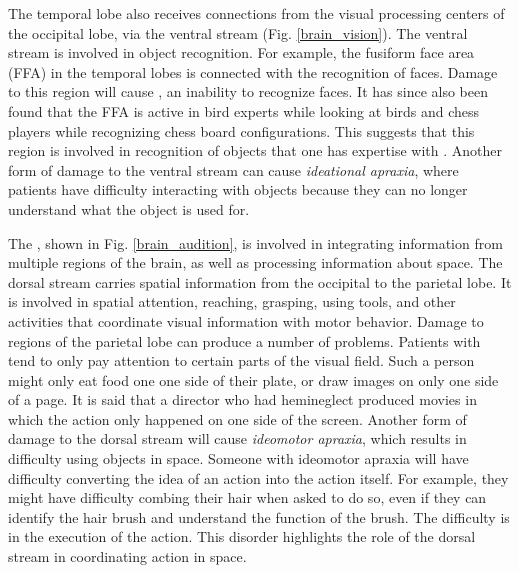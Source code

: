 The  temporal lobe also receives connections from the visual processing centers of the occipital lobe, via the ventral stream (Fig. \ref{brain_vision}). The ventral stream is involved in object recognition. For example, the fusiform face area (FFA) in the temporal lobes is connected with the recognition of faces. Damage to this region will cause , an inability to recognize faces. It has since also been found that the FFA is active in bird experts while looking at birds and chess players while recognizing chess board configurations. This suggests that this region is involved in recognition of objects that one has expertise with \cite{boggan2011chess}. Another form of damage to the ventral stream can cause \emph{ideational apraxia}, where patients have difficulty interacting with objects because they can no longer understand what the object is used for. 

The , shown in Fig. \ref{brain_audition}, is involved in integrating information from multiple regions of the brain, as well as processing information about space. The dorsal stream carries spatial information from the occipital to the parietal lobe. It is involved in spatial attention, reaching, grasping, using tools, and other activities that coordinate visual information with motor behavior. Damage to regions of the parietal lobe can produce a number of problems. Patients with  tend to only pay attention to certain parts of the visual field. Such a person might only eat food one one side of their plate, or draw images on only one side of a page. It is said that a director who had hemineglect produced movies in which the action only happened on one side of the screen. Another form of damage to  the dorsal stream will cause \emph{ideomotor apraxia}, which results in difficulty using objects in space. Someone with ideomotor apraxia will have difficulty converting the idea of an action into the action itself. For example, they might have difficulty combing their hair when asked to do so, even if they can identify the hair brush and understand the function of the brush. The difficulty is in the execution of the action. This disorder highlights the role of the dorsal stream in coordinating action in space.

